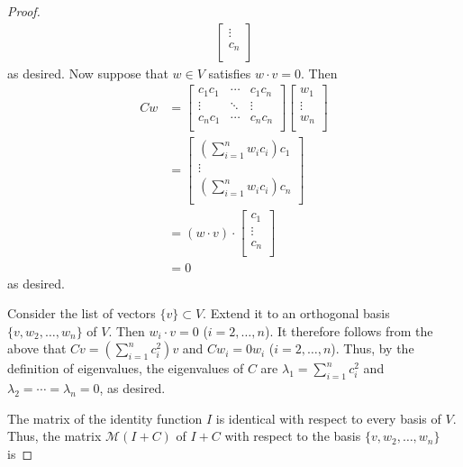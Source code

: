 \documentclass[../psets.tex]{subfiles}
\begin{document}
\begin{enumerate}[label={\textbf{4.4.\roman*.}}]
\begin{proof}
\begin{align*}
\begin{bmatrix}
                \vdots\\
                c_n\\
            \end{bmatrix}
        \end{align*}
        as desired. Now suppose that $w\in V$ satisfies $w\cdot v=0$. Then
        \begin{align*}
            Cw &=
            \begin{bmatrix}
                c_1c_1 & \cdots & c_1c_n\\
                \vdots & \ddots & \vdots\\
                c_nc_1 & \cdots & c_nc_n\\
            \end{bmatrix}
            \begin{bmatrix}
                w_1\\
                \vdots\\
                w_n\\
            \end{bmatrix}\\
            &=
            \begin{bmatrix}
                \left( \sum_{i=1}^n w_ic_i \right)c_1\\
                \vdots\\
                \left( \sum_{i=1}^n w_ic_i \right)c_n\\
            \end{bmatrix}\\
            &= (w\cdot v)\cdot
            \begin{bmatrix}
                c_1\\
                \vdots\\
                c_n\\
            \end{bmatrix}\\
            &= 0
        \end{align*}
        as desired.\par
        Consider the list of vectors $\{v\}\subset V$. Extend it to an orthogonal basis $\{v,w_2,\dots,w_n\}$ of $V$. Then $w_i\cdot v=0$ ($i=2,\dots,n$). It therefore follows from the above that $Cv=(\sum_{i=1}^nc_i^2)v$ and $Cw_i=0w_i$ ($i=2,\dots,n$). Thus, by the definition of eigenvalues, the eigenvalues of $C$ are $\lambda_1=\sum_{i=1}^nc_i^2$ and $\lambda_2=\cdots=\lambda_n=0$, as desired.\par
        The matrix of the identity function $I$ is identical with respect to every basis of $V$. Thus, the matrix $\mathcal{M}(I+C)$ of $I+C$ with respect to the basis $\{v,w_2,\dots,w_n\}$ is

\end{proof}
\end{enumerate}
\end{document}
